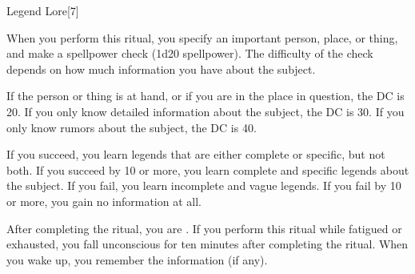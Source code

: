 \begin{spellsection}[Greater]{Legend Lore}[7]
    \begin{spellheader}
    \end{spellheader}
    \begin{spellcontent}
        \begin{spelltargetinginfo}
        \end{spelltargetinginfo}
        \begin{spelleffects}

            \spellline
            \spelleffect When you perform this ritual, you specify an important person, place, or thing, and make a spellpower check (1d20 \add spellpower). The difficulty of the check depends on how much information you have about the subject.

            If the person or thing is at hand, or if you are in the place in question, the DC is 20. If you only know detailed information about the subject, the DC is 30. If you only know rumors about the subject, the DC is 40.

            If you succeed, you learn legends that are either complete or specific, but not both. If you succeed by 10 or more, you learn complete and specific legends about the subject.  If you fail, you learn incomplete and vague legends. If you fail by 10 or more, you gain no information at all.

            After completing the ritual, you are \exhausted. If you perform this ritual while fatigued or exhausted, you fall unconscious for ten minutes after completing the ritual. When you wake up, you remember the information (if any).
        \end{spelleffects}
    \end{spellcontent}
    \begin{spellfooter}
    \end{spellfooter}
\end{spellsection}

